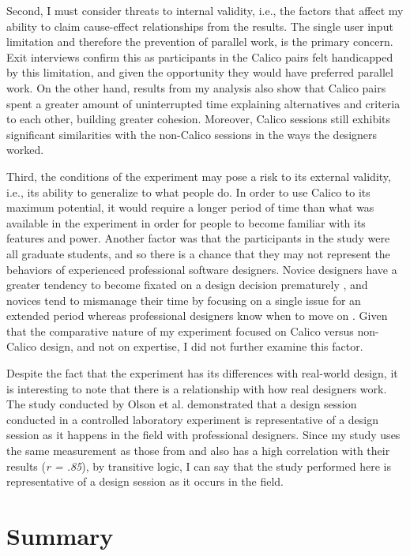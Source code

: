 Second, I must consider threats to internal validity, i.e., the factors that affect my ability to claim cause-effect relationships from the results. The single user input limitation and therefore the prevention of parallel work, is the primary concern. Exit interviews confirm this as participants in the Calico pairs felt handicapped by this limitation, and given the opportunity they would have preferred parallel work. On the other hand, results from my analysis also show that Calico pairs spent a greater amount of uninterrupted time explaining alternatives and criteria to each other, building greater cohesion. Moreover, Calico sessions still exhibits significant similarities with the non-Calico sessions in the ways the designers worked. 

Third, the conditions of the experiment may pose a risk to its external validity, i.e., its ability to generalize to what people do. In order to use Calico to its maximum potential, it would require a longer period of time than what was available in the experiment in order for people to become familiar with its features and power. Another factor was that the participants in the study were all graduate students, and so there is a chance that they may not represent the behaviors of experienced professional software designers. Novice designers have a greater tendency to become fixated on a design decision prematurely \citep{Ball}, and novices tend to mismanage their time by focusing on a single issue for an extended period whereas professional designers know when to move on \citep{Baker}. Given that the comparative nature of my experiment focused on Calico versus non-Calico design, and not on expertise, I did not further examine this factor.

Despite the fact that the experiment has its differences with real-world design, it is interesting to note that there is a relationship with how real designers work. The study conducted by Olson et al. \citep{Olsonb} demonstrated that a design session conducted in a controlled laboratory experiment is representative of a design session as it happens in the field with professional designers. Since my study uses the same measurement as those from \citep{Olsonb} and also has a high correlation with their results (\emph{r = .85}), by transitive logic, I can say that the study performed here is representative of a design session as it occurs in the field.

\section{Summary}
\label{conclusions}

